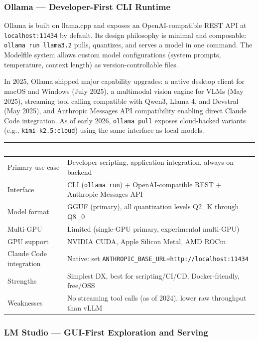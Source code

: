 \documentclass[11pt,letterpaper]{article}
\newcommand{\tableheader}[1]{\textbf{\sffamily\textcolor{white}{#1}}}
\begin{document}
\subsubsection{Ollama --- Developer-First CLI Runtime}

Ollama is built on llama.cpp and exposes an OpenAI-compatible REST API at \texttt{localhost:11434} by default. Its design philosophy is minimal and composable: \texttt{ollama run llama3.2} pulls, quantizes, and serves a model in one command. The Modelfile system allows custom model configurations (system prompts, temperature, context length) as version-controllable files.

In 2025, Ollama shipped major capability upgrades: a native desktop client for macOS and Windows (July 2025), a multimodal vision engine for VLMs (May 2025), streaming tool calling compatible with Qwen3, Llama 4, and Devstral (May 2025), and Anthropic Messages API compatibility enabling direct Claude Code integration. As of early 2026, \texttt{ollama pull} exposes cloud-backed variants (e.g., \texttt{kimi-k2.5:cloud}) using the same interface as local models.

\begin{center}
\begin{tabularx}{\textwidth}{L{2.8cm}X}
\toprule
{}
\tableheader{Attribute} & \tableheader{Ollama Detail} \\
\midrule
Primary use case & Developer scripting, application integration, always-on backend \\
Interface & CLI (\texttt{ollama run}) + OpenAI-compatible REST + Anthropic Messages API \\
Model format & GGUF (primary), all quantization levels Q2\_K through Q8\_0 \\
Multi-GPU & Limited (single-GPU primary, experimental multi-GPU) \\
GPU support & NVIDIA CUDA, Apple Silicon Metal, AMD ROCm \\
Claude Code integration & Native: set \texttt{ANTHROPIC\_BASE\_URL=http://localhost:11434} \\
Strengths & Simplest DX, best for scripting/CI/CD, Docker-friendly, free/OSS \\
Weaknesses & No streaming tool calls (as of 2024), lower raw throughput than vLLM \\
\bottomrule
\end{tabularx}
\end{center}

\subsubsection{LM Studio --- GUI-First Exploration and Serving}
\end{document}
